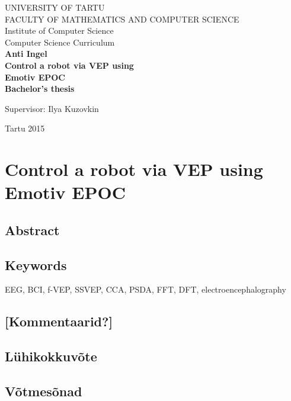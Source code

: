 \documentclass[a4paper,12pt]{report}
\begin{document}


\begin{center}
\thispagestyle{empty}
\large{UNIVERSITY OF TARTU}\\
\large{FACULTY OF MATHEMATICS AND COMPUTER SCIENCE}\\
\large{Institute of Computer Science}\\
\large{Computer Science Curriculum}\\
\vspace{160pt}
\Large{\bf Anti Ingel}\\
\vspace{6pt}
\LARGE{\textbf{Control a robot via VEP using \\Emotiv EPOC}}\\
\vspace{12pt}
\large{\bf Bachelor's thesis}
\vspace{63pt}
\end{center}
\hfill \Large{Supervisor: Ilya Kuzovkin}
\vfill
\begin{center}
\normalsize{Tartu 2015}
\end{center}


\chapter*{Control a robot via VEP using Emotiv EPOC}
\section*{Abstract}
\section*{Keywords}
\normalsize{EEG, BCI, f-VEP, SSVEP, CCA, PSDA, FFT, DFT, electroencephalography}
\section*{[Kommentaarid?]}
\section*{Lühikokkuvõte}
\section*{Võtmesõnad}
\end{document}
